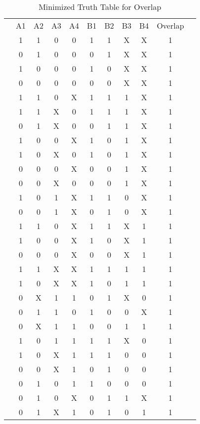 \documentclass[letterpaper,titlepage,&1&pt,oneside]{article}
\begin{document}
\begin{table}['t']
\begin{tabular}{c|c|c|c|c|c|c|c|c|c|c}
\cline{2-10}
&A1&A2&A3&A4&B1&B2&B3&B4&Overlap& \\ \cline{2-10}
&1&1&0&0&1&1&X&X&1& \\
&0&1&0&0&0&1&X&X&1& \\
&1&0&0&0&1&0&X&X&1& \\
&0&0&0&0&0&0&X&X&1& \\
&1&1&0&X&1&1&1&X&1& \\
&1&1&X&0&1&1&1&X&1& \\
&0&1&X&0&0&1&1&X&1& \\
&1&0&0&X&1&0&1&X&1& \\
&1&0&X&0&1&0&1&X&1& \\
&0&0&0&X&0&0&1&X&1& \\
&0&0&X&0&0&0&1&X&1& \\
&1&0&1&X&1&1&0&X&1& \\
&0&0&1&X&0&1&0&X&1& \\
&1&1&0&X&1&1&X&1&1& \\
&1&0&0&X&1&0&X&1&1& \\
&0&0&0&X&0&0&X&1&1& \\
&1&1&X&X&1&1&1&1&1& \\
&1&0&X&X&1&0&1&1&1& \\
&0&X&1&1&0&1&X&0&1& \\
&0&1&1&0&1&0&0&X&1& \\
&0&X&1&1&0&0&1&1&1& \\
&1&0&1&1&1&1&X&0&1& \\
&1&0&X&1&1&1&0&0&1& \\
&0&0&X&1&0&1&0&0&1& \\
&0&1&0&1&1&0&0&0&1& \\
&0&1&0&X&0&1&1&X&1& \\
&0&1&X&1&0&1&0&1&1& \\
\cline{2-10}
\end{tabular}
\caption{Minimized Truth Table for Overlap}\label{table:Overlap_Minimized}
\end{table}
\end{document}
